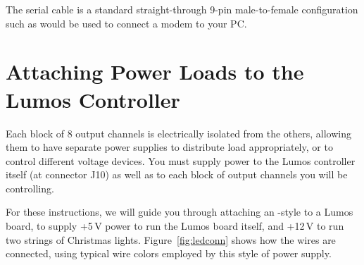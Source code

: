 \documentclass[letterpaper,twoside,onecolumn,openright,final]{memoir}
\begin{document}
The serial cable is a standard straight-through 9-pin male-to-female configuration such as would be used
to connect a modem to your PC.

\section{Attaching Power Loads to the Lumos Controller}
Each block of 8 output channels is electrically isolated from the others, allowing them to have
separate power supplies to distribute load appropriately, or to control different voltage devices.
You must supply power to the Lumos controller itself (at connector J10) as well as to each block of 
output channels you will be controlling.

For these instructions, we will guide you through attaching an -style  to a 
Lumos board, to supply +5\,V power to run the Lumos board itself, and +12\,V to run two strings of 
Christmas lights.  Figure~\ref{fig:ledconn} shows how the wires are connected, using typical wire colors
employed by this style of power supply.
\end{document}
